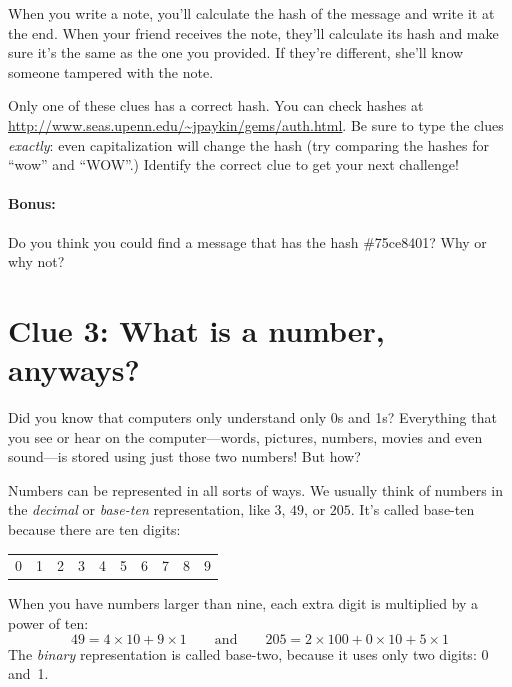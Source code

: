 \documentclass{article}
\begin{document}
When you write a note, you'll calculate the hash of the message and write it at the end. When your friend receives the note, they'll calculate its hash and make sure it's the same as the one you provided. If they're different, she'll know someone tampered with the note.

Only one of these clues has a correct hash. You can check hashes at \url{http://www.seas.upenn.edu/~jpaykin/gems/auth.html}. Be sure to type the clues \textit{exactly}: even capitalization will change the hash (try comparing the hashes for ``wow'' and ``WOW''.) Identify the correct clue to get your next challenge!

\paragraph{Bonus:} Do you think you could find a message that has the hash \#75ce8401? Why or why not?


\newpage

\section*{Clue 3: What is a number, anyways?}

Did you know that computers only understand only 0s and 1s? Everything that you
see or hear on the computer---words, pictures, numbers, movies and even sound---is
stored using just those two numbers! But how? 

Numbers can be represented in all sorts of ways. We usually think of numbers in
the \emph{decimal} or \emph{base-ten} representation, like $3$, $49$, or $205$.
It's called base-ten because there are ten digits:
\begin{center}\begin{tabular}{cccccccccc}
    0 & 1 & 2 & 3 & 4 & 5 & 6 & 7 & 8 & 9
\end{tabular}\end{center}
When you have numbers larger than nine, each extra digit is multiplied by a
power of ten:
\[
    49 = 4\times10 + 9\times1 \qquad\textrm{and}\qquad 
    205 = 2\times100 + 0\times10 + 5\times1
\]
The \emph{binary} representation is called base-two, because it uses only
two digits: 0 and~1. 
\end{document}
